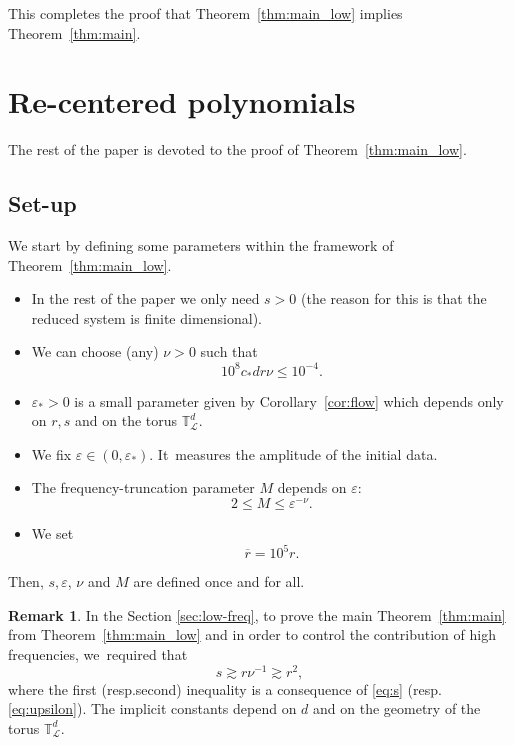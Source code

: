 \documentclass[10pt,a4paper]{amsart}
\providecommand{\resp}{resp.}
\theoremstyle{plain}
\theoremstyle{definition}
\newtheorem{remark}[theorem]{Remark}
\newcommand{\T}{\mathbb{T}}
\newcommand{\1}{\mathbf{1}}
\let\epsilon\varepsilon
\begin{document}
This completes the proof that Theorem~\ref{thm:main_low} implies Theorem~\ref{thm:main}.

\section{Re-centered polynomials}
\label{sec:small-div}

The rest of the paper is devoted to the proof of Theorem~\ref{thm:main_low}.

\subsection{Set-up}
\label{sec:su}
We start by defining some parameters within the framework of Theorem~\ref{thm:main_low}.

\begin{itemize}
\item In the rest of the paper we only need $s>0$ (the reason for this is that the reduced system is finite dimensional).
\item We can choose (any) $\nu>0$ such that
\begin{equation}
\label{eq:upsilon}
10^{8}c_{\ast} d r \nu \leq 10^{-4}.
\end{equation}

\item $\epsilon_{\ast}>0$ is a small parameter given by Corollary~\ref{cor:flow} which depends only on $r, s$ and on the torus $\T^{d}_{\mathscr{L}}$.
\item We fix $\epsilon\in(0,\epsilon_{\ast})$. It~measures the amplitude of the initial data.
\item The frequency-truncation parameter $M$ depends on $\epsilon$:\vspace*{-3pt}
\[
2\leq M\leq \epsilon^{-\nu}.
\]
\item We set\vspace*{-3pt}
\[
\overline{r} = 10^{5}r.
\]
\end{itemize}
Then, $s, \epsilon$, $\nu$ and $M$ are defined once and for all.
\begin{remark}
In the Section \ref{sec:low-freq}, to prove the main Theorem~\ref{thm:main} from Theorem~\ref{thm:main_low} and in order to control the contribution of high frequencies, we~required that\vspace*{-3pt}
\[
s\gtrsim r\nu^{-1} \gtrsim r^{2},
\]
where the first (\resp second) inequality is a consequence of \eqref{eq:s} (\resp \eqref{eq:upsilon}). The implicit constants depend on $d$ and on the geometry of the torus $\T_{\mathscr{L}}^{d}$.
\end{remark}
\end{document}
